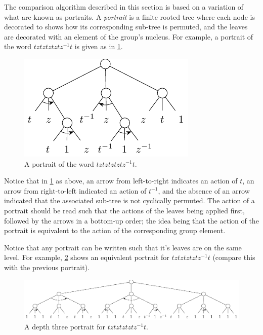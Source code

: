 The comparison algorithm described in this section is based on a variation of what are known as portraits.
A \emph{portrait} is a finite rooted tree where each node is decorated to shows how its corresponding sub-tree is permuted, and the leaves are decorated with an element of the group's nucleus.
For example, a portrait of the word $tztztztztz^{-1}t$ is given as in \cref{fig:tztztztztZtPortrait}.

\begin{figure}[!ht]
	\centering
	\includegraphics[width=.4\linewidth]{figures/portraits/tztztztztZtPortrait}

	\caption{A portrait of the word $tztztztztz^{-1}t$.}
	\label{fig:tztztztztZtPortrait}
\end{figure}

Notice that in \cref{fig:tztztztztZtPortrait} as above, an arrow from left-to-right indicates an action of $t$, an arrow from right-to-left indicated an action of $t^{-1}$, and the absence of an arrow indicated that the associated sub-tree is not cyclically permuted.
The action of a portrait should be read such that the actions of the leaves being applied first, followed by the arrows in a bottom-up order; the idea being that the action of the portrait is equivalent to the action of the corresponding group element.

Notice that any portrait can be written such that it's leaves are on the same level.
For example, \cref{fig:port2} shows an equivalent portrait for $tztztztztz^{-1}t$ (compare this with the previous portrait).

\begin{figure}[!ht]
\begin{center}
	\includegraphics[width=\linewidth]{figures/portraits/tztztztztZtPortraitFull}
\end{center}
	\caption{A depth three portrait for $tztztztztz^{-1}t$.}
	\label{fig:port2}
\end{figure}

